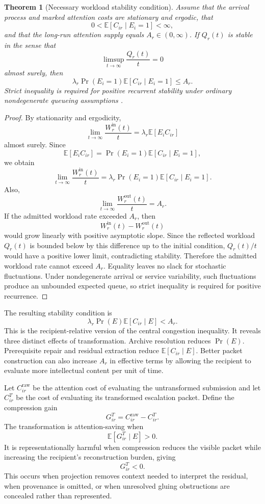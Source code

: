 \documentclass[11pt]{article}
\newtheorem{theorem}[definition]{Theorem}
\theoremstyle{definition}
\newcommand{\E}{\mathbb{E}}
\begin{document}
\begin{theorem}[Necessary workload stability condition]
Assume that the arrival process and marked attention costs are stationary and ergodic, that
\[
0<
\E[C_{ir}\mid E_i=1]
<
\infty,
\]
and that the long-run attention supply equals \(A_r\in(0,\infty)\). If \(Q_r(t)\) is stable in the sense that
\[
\limsup_{t\to\infty}\frac{Q_r(t)}{t}=0
\]
almost surely, then
\[
\lambda_r
\Pr(E_i=1)
\E[C_{ir}\mid E_i=1]
\leq
A_r.
\]
Strict inequality is required for positive recurrent stability under ordinary nondegenerate queueing assumptions \cite{kleinrock1975}.
\end{theorem}

\begin{proof}
By stationarity and ergodicity,
\[
\lim_{t\to\infty}
\frac{W_r^{\mathrm{in}}(t)}{t}
=
\lambda_r
\E[E_i C_{ir}]
\]
almost surely. Since
\[
\E[E_iC_{ir}]
=
\Pr(E_i=1)\E[C_{ir}\mid E_i=1],
\]
we obtain
\[
\lim_{t\to\infty}
\frac{W_r^{\mathrm{in}}(t)}{t}
=
\lambda_r
\Pr(E_i=1)
\E[C_{ir}\mid E_i=1].
\]
Also,
\[
\lim_{t\to\infty}
\frac{W_r^{\mathrm{out}}(t)}{t}
=
A_r.
\]
If the admitted workload rate exceeded \(A_r\), then
\[
W_r^{\mathrm{in}}(t)-W_r^{\mathrm{out}}(t)
\]
would grow linearly with positive asymptotic slope. Since the reflected workload \(Q_r(t)\) is bounded below by this difference up to the initial condition, \(Q_r(t)/t\) would have a positive lower limit, contradicting stability. Therefore the admitted workload rate cannot exceed \(A_r\). Equality leaves no slack for stochastic fluctuations. Under nondegenerate arrival or service variability, such fluctuations produce an unbounded expected queue, so strict inequality is required for positive recurrence.
\end{proof}

The resulting stability condition is
\[
\lambda_r
\Pr(E)
\E[C_{ir}\mid E]
<
A_r.
\]
This is the recipient-relative version of the central congestion inequality. It reveals three distinct effects of transformation. Archive resolution reduces \(\Pr(E)\). Prerequisite repair and residual extraction reduce \(\E[C_{ir}\mid E]\). Better packet construction can also increase \(A_r\) in effective terms by allowing the recipient to evaluate more intellectual content per unit of time.

Let \(C_{ir}^{\mathrm{raw}}\) be the attention cost of evaluating the untransformed submission and let \(C_{ir}^{T}\) be the cost of evaluating its transformed escalation packet. Define the compression gain
\[
G_{ir}^{T}
=
C_{ir}^{\mathrm{raw}}-C_{ir}^{T}.
\]
The transformation is attention-saving when
\[
\E[G_{ir}^{T}\mid E]>0.
\]
It is representationally harmful when compression reduces the visible packet while increasing the recipient's reconstruction burden, giving
\[
G_{ir}^{T}<0.
\]
This occurs when projection removes context needed to interpret the residual, when provenance is omitted, or when unresolved gluing obstructions are concealed rather than represented.
\end{document}
